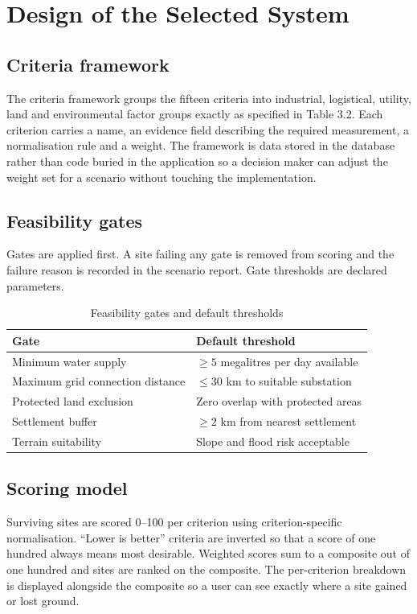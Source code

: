 \documentclass[12pt,a4paper]{report}
\begin{document}
\section{Design of the Selected System}

\subsection{Criteria framework}
The criteria framework groups the fifteen criteria into industrial,
logistical, utility, land and environmental factor groups exactly as
specified in Table 3.2. Each criterion carries a name, an evidence
field describing the required measurement, a normalisation rule and a
weight. The framework is data stored in the database rather than code
buried in the application so a decision maker can adjust the weight
set for a scenario without touching the implementation.

\subsection{Feasibility gates}
Gates are applied first. A site failing any gate is removed from
scoring and the failure reason is recorded in the scenario report.
Gate thresholds are declared parameters.

\begin{table}[h]
\centering
\caption{Feasibility gates and default thresholds}
\begin{tabular}{p{6.4cm}p{6.6cm}}
\toprule
Gate & Default threshold \\
\midrule
Minimum water supply & $\geq 5$ megalitres per day available \\
Maximum grid connection distance & $\leq 30$ km to suitable substation \\
Protected land exclusion & Zero overlap with protected areas \\
Settlement buffer & $\geq 2$ km from nearest settlement \\
Terrain suitability & Slope and flood risk acceptable \\
\bottomrule
\end{tabular}
\end{table}

\subsection{Scoring model}
Surviving sites are scored 0--100 per criterion using criterion-specific
normalisation. ``Lower is better'' criteria are inverted so that a
score of one hundred always means most desirable. Weighted scores sum
to a composite out of one hundred and sites are ranked on the
composite. The per-criterion breakdown is displayed alongside the
composite so a user can see exactly where a site gained or lost
ground.
\end{document}
